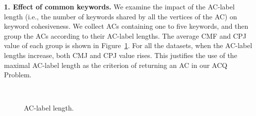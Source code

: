 {\bf 1. Effect of common keywords.} We examine the impact of the AC-label length
(i.e., the number of keywords shared by all the vertices of the AC) on keyword cohesiveness.
We collect ACs containing one to five keywords, and then group the ACs according to their AC-label lengths. The average CMF and CPJ value of each group is shown in Figure~\ref{fig:measure-share}. For all the datasets, when the AC-label lengths increase, both CMJ and CPJ value rises. This justifies the use of the maximal AC-label length as the criterion of returning an AC in our ACQ Problem.

\begin{figure}[ht]
    \centering
    \mbox{
        \hspace{2ex}
    }
    \caption{AC-label length.}\label{fig:measure-share}
\end{figure}


